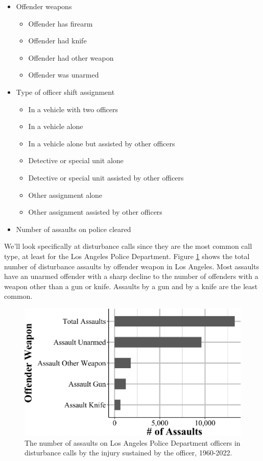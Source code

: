 \documentclass[
  12pt,
  openany]{book}
\providecommand{\tightlist}{%
  \setlength{\itemsep}{0pt}\setlength{\parskip}{0pt}}
\begin{document}
\begin{itemize}
\tightlist
\item
  Offender weapons

  \begin{itemize}
  \tightlist
  \item
    Offender has firearm
  \item
    Offender had knife
  \item
    Offender had other weapon
  \item
    Offender was unarmed
  \end{itemize}
\item
  Type of officer shift assignment

  \begin{itemize}
  \tightlist
  \item
    In a vehicle with two officers
  \item
    In a vehicle alone
  \item
    In a vehicle alone but assisted by other officers
  \item
    Detective or special unit alone
  \item
    Detective or special unit assisted by other officers
  \item
    Other assignment alone
  \item
    Other assignment assisted by other officers
  \end{itemize}
\item
  Number of assaults on police cleared
\end{itemize}

We'll look specifically at disturbance calls since they are the most common call type, at least for the Los Angeles Police Department. Figure \ref{fig:leokaDisturbanceWeapon} shows the total number of disturbance assaults by offender weapon in Los Angeles. Most assaults have an unarmed offender with a sharp decline to the number of offenders with a weapon other than a gun or knife. Assaults by a gun and by a knife are the least common.

\begin{figure}

{\centering \includegraphics[width=0.9\linewidth]{07_leoka_files/figure-latex/leokaDisturbanceWeapon-1} 

}

\caption{The number of assaults on Los Angeles Police Department officers in disturbance calls by the injury sustained by the officer, 1960-2022.}\label{fig:leokaDisturbanceWeapon}
\end{figure}
\end{document}
